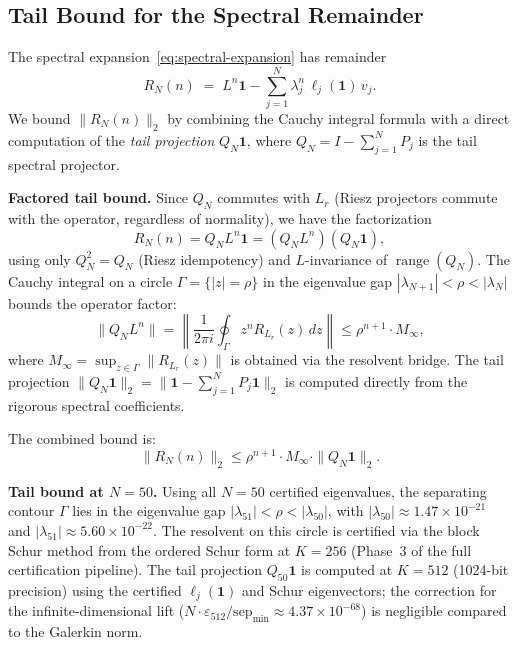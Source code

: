\documentclass[11pt]{article}
\begin{document}
\clearpage
\subsection*{Tail Bound for the Spectral Remainder}

The spectral expansion~\eqref{eq:spectral-expansion} has remainder
\[
R_N(n) \;=\; L^n \mathbf{1} - \sum_{j=1}^{N} \lambda_j^n \, \ell_j(\mathbf{1}) \, v_j.
\]
We bound $\|R_N(n)\|_2$ by combining the Cauchy integral formula with a
direct computation of the \emph{tail projection} $Q_N \mathbf{1}$, where
$Q_N = I - \sum_{j=1}^N P_j$ is the tail spectral projector.

\medskip\noindent
\textbf{Factored tail bound.}
Since $Q_N$ commutes with $L_r$ (Riesz projectors commute with the operator,
regardless of normality), we have the factorization
\[
R_N(n) = Q_N L^n \mathbf{1} = (Q_N L^n)(Q_N \mathbf{1}),
\]
using only $Q_N^2 = Q_N$ (Riesz idempotency) and $L$-invariance of $\operatorname{range}(Q_N)$.
The Cauchy integral on a circle $\Gamma = \{|z| = \rho\}$ in the eigenvalue gap
$|\lambda_{N+1}| < \rho < |\lambda_N|$ bounds the operator factor:
\[
\|Q_N L^n\| = \left\|\frac{1}{2\pi i} \oint_\Gamma z^n R_{L_r}(z)\,dz\right\|
\leq \rho^{n+1} \cdot M_\infty,
\]
where $M_\infty = \sup_{z\in\Gamma} \|R_{L_r}(z)\|$ is obtained via the resolvent bridge.
The tail projection $\|Q_N \mathbf{1}\|_2 = \|\mathbf{1} - \sum_{j=1}^N P_j \mathbf{1}\|_2$
is computed directly from the rigorous spectral coefficients.

The combined bound is:
\[
\boxed{\|R_N(n)\|_2 \leq \rho^{n+1} \cdot M_\infty \cdot \|Q_N \mathbf{1}\|_2.}
\]

\medskip\noindent
\textbf{Tail bound at $N = 50$.}
Using all $N = 50$ certified eigenvalues, the separating contour $\Gamma$ lies
in the eigenvalue gap $|\lambda_{51}| < \rho < |\lambda_{50}|$,
with $|\lambda_{50}| \approx 1.47 \times 10^{-21}$ and
$|\lambda_{51}| \approx 5.60 \times 10^{-22}$.
The resolvent on this circle is certified via the block Schur
method from the ordered Schur form at $K = 256$
(Phase~3 of the full certification pipeline).
The tail projection $Q_{50}\mathbf{1}$ is computed at $K = 512$
(1024-bit precision) using the certified $\ell_j(\mathbf{1})$ and Schur eigenvectors;
the correction for the infinite-dimensional lift ($N \cdot \varepsilon_{512} / \mathrm{sep}_{\min}
\approx 4.37 \times 10^{-68}$) is negligible compared to the Galerkin norm.
\end{document}
